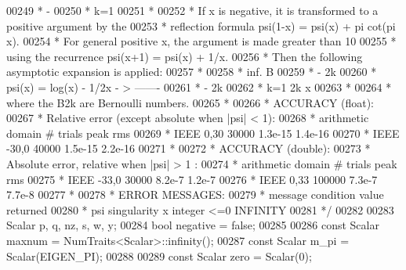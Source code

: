 \begin{DoxyCode}
00249 \textcolor{comment}{     *                    -}
00250 \textcolor{comment}{     *                   k=1}
00251 \textcolor{comment}{     *}
00252 \textcolor{comment}{     * If x is negative, it is transformed to a positive argument by the}
00253 \textcolor{comment}{     * reflection formula  psi(1-x) = psi(x) + pi cot(pi x).}
00254 \textcolor{comment}{     * For general positive x, the argument is made greater than 10}
00255 \textcolor{comment}{     * using the recurrence  psi(x+1) = psi(x) + 1/x.}
00256 \textcolor{comment}{     * Then the following asymptotic expansion is applied:}
00257 \textcolor{comment}{     *}
00258 \textcolor{comment}{     *                           inf.   B}
00259 \textcolor{comment}{     *                            -      2k}
00260 \textcolor{comment}{     * psi(x) = log(x) - 1/2x -   >   -------}
00261 \textcolor{comment}{     *                            -        2k}
00262 \textcolor{comment}{     *                           k=1   2k x}
00263 \textcolor{comment}{     *}
00264 \textcolor{comment}{     * where the B2k are Bernoulli numbers.}
00265 \textcolor{comment}{     *}
00266 \textcolor{comment}{     * ACCURACY (float):}
00267 \textcolor{comment}{     *    Relative error (except absolute when |psi| < 1):}
00268 \textcolor{comment}{     * arithmetic   domain     # trials      peak         rms}
00269 \textcolor{comment}{     *    IEEE      0,30        30000       1.3e-15     1.4e-16}
00270 \textcolor{comment}{     *    IEEE      -30,0       40000       1.5e-15     2.2e-16}
00271 \textcolor{comment}{     *}
00272 \textcolor{comment}{     * ACCURACY (double):}
00273 \textcolor{comment}{     *    Absolute error,  relative when |psi| > 1 :}
00274 \textcolor{comment}{     * arithmetic   domain     # trials      peak         rms}
00275 \textcolor{comment}{     *    IEEE      -33,0        30000      8.2e-7      1.2e-7}
00276 \textcolor{comment}{     *    IEEE      0,33        100000      7.3e-7      7.7e-8}
00277 \textcolor{comment}{     *}
00278 \textcolor{comment}{     * ERROR MESSAGES:}
00279 \textcolor{comment}{     *     message         condition      value returned}
00280 \textcolor{comment}{     * psi singularity    x integer <=0      INFINITY}
00281 \textcolor{comment}{     */}
00282 
00283     Scalar p, q, nz, s, w, y;
00284     \textcolor{keywordtype}{bool} negative = \textcolor{keyword}{false};
00285 
00286     \textcolor{keyword}{const} Scalar maxnum = NumTraits<Scalar>::infinity();
00287     \textcolor{keyword}{const} Scalar m\_pi = Scalar(EIGEN\_PI);
00288 
00289     \textcolor{keyword}{const} Scalar zero = Scalar(0);

\end{DoxyCode}
